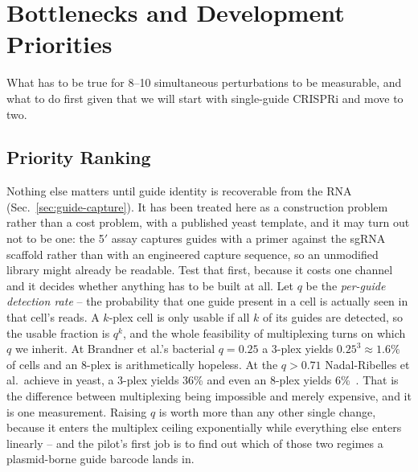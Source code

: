 
\section{Bottlenecks and Development Priorities}
\label{sec:bottlenecks}

What has to be true for 8--10 simultaneous perturbations to be measurable, and
what to do first given that we will start with single-guide CRISPRi and move to
two.

\subsection{Priority Ranking}
\label{sec:ranked}

 Nothing else matters until guide identity is
recoverable from the RNA (Sec.~\ref{sec:guide-capture}). It has been treated here
as a construction problem rather than a cost problem, with a published yeast
template, and it may turn out not to be one: the 5$'$ assay captures guides with
a primer against the sgRNA scaffold rather than with an engineered capture
sequence, so an unmodified library might already be readable. Test that first,
because it costs one channel and it decides whether anything has to be built at
all. Let $q$ be the \emph{per-guide detection rate} -- the probability that
one guide present in a cell is actually seen in that cell's reads. A $k$-plex cell
is only usable if all $k$ of its guides are detected, so the usable fraction is
$q^{k}$, and the whole feasibility of multiplexing turns on which $q$ we inherit.
At Brandner et al.'s bacterial $q=0.25$ a 3-plex yields $0.25^{3}\approx1.6\%$ of
cells and an 8-plex is arithmetically hopeless. At the $q>0.71$ Nadal-Ribelles et
al.\ achieve in yeast, a 3-plex yields 36\% and even an 8-plex yields
6\%~\citep{nadal-ribellesSinglecellResolvedGenotypephenotype2025}. That is the
difference between multiplexing being impossible and merely expensive, and it is
one measurement. Raising $q$ is worth more than any other single change, because
it enters the multiplex ceiling exponentially while everything else enters
linearly -- and the pilot's first job is to find out which of those two regimes a
plasmid-borne guide barcode lands in.

